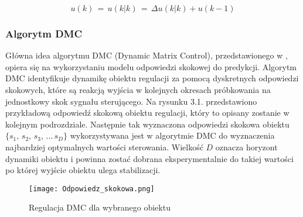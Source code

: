 \begin{equation}
u(k) \, = \, u(k|k) \, = \, \Delta u(k|k) + u(k-1)
\end{equation}

\subsubsection{Algorytm DMC}
Główna idea algorytmu DMC (Dynamic Matrix Control), przedstawionego w \cite{dmc1979}, opiera się na wykorzystaniu modelu odpowiedzi skokowej do predykcji. Algorytm DMC identyfikuje dynamikę obiektu regulacji za pomocą dyskretnych odpowiedzi skokowych, które są reakcją wyjścia w kolejnych okresach próbkowania na jednostkowy skok sygnału sterującego. Na rysunku 3.1. przedstawiono przykładową odpowiedź skokową obiektu regulacji, który to opisany zostanie w kolejnym podrozdziale. Następnie tak wyznaczona odpowiedzi skokowa obiektu \(\{s_1,\, s_2,\, s_3,\, ...\, s_D \}\) wykorzystywana jest w algorytmie DMC do wyznaczenia najbardziej optymalnych wartości sterowania. Wielkość \(D\) oznacza horyzont dynamiki obiektu i powinna zostać dobrana eksperymentalnie do takiej wartości po której wyjście obiektu ulega stabilizacji. 
\begin{figure}[!h]
    \label{fig:Odpowiedz-skokowa}
    \centering \texttt{[image: Odpowiedz\_skokowa.png]}
    \caption{Regulacja DMC dla wybranego obiektu}
\end{figure}

